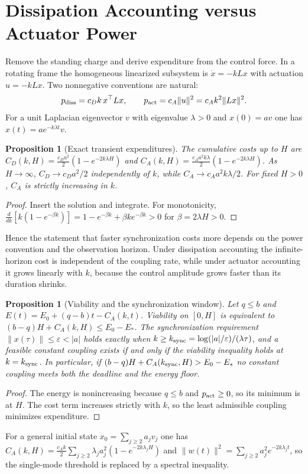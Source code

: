 \documentclass[11pt,notitlepage]{report}
\newtheorem{proposition}[theorem]{Proposition}
\theoremstyle{definition}
\theoremstyle{remark}
\begin{document}
\section{Dissipation Accounting versus Actuator Power}
Remove the standing charge and derive expenditure from the control force. In a rotating frame the homogeneous linearized subsystem is $\dot x=-kLx$ with actuation $u=-kLx$. Two nonnegative conventions are natural:
\[
p_{\rm diss}=c_Dk\,x^\top Lx,\qquad p_{\rm act}=c_A\|u\|^2=c_Ak^2\|Lx\|^2.
\]
For a unit Laplacian eigenvector $v$ with eigenvalue $\lambda>0$ and $x(0)=av$ one has $x(t)=ae^{-k\lambda t}v$.
\begin{proposition}[Exact transient expenditures]\label{prop:transient}
The cumulative costs up to $H$ are
$C_D(k,H)=\tfrac{c_Da^2}2(1-e^{-2k\lambda H})$ and $C_A(k,H)=\tfrac{c_Aa^2k\lambda}2(1-e^{-2k\lambda H})$. As $H\to\infty$, $C_D\to c_Da^2/2$ independently of $k$, while $C_A\to c_Aa^2k\lambda/2$. For fixed $H>0$, $C_A$ is strictly increasing in $k$.
\end{proposition}
\begin{proof}
Insert the solution and integrate. For monotonicity, $\tfrac{d}{dk}[k(1-e^{-\beta k})]=1-e^{-\beta k}+\beta ke^{-\beta k}>0$ for $\beta=2\lambda H>0$.
\end{proof}
Hence the statement that faster synchronization costs more depends on the power convention and the observation horizon. Under dissipation accounting the infinite-horizon cost is independent of the coupling rate, while under actuator accounting it grows linearly with $k$, because the control amplitude grows faster than its duration shrinks.

\begin{proposition}[Viability and the synchronization window]\label{prop:actwindow}
Let $q\le b$ and $E(t)=E_0+(q-b)t-C_A(k,t)$. Viability on $[0,H]$ is equivalent to $(b-q)H+C_A(k,H)\le E_0-E_*$. The synchronization requirement $\|x(\tau)\|\le\varepsilon<|a|$ holds exactly when $k\ge k_{\rm sync}=\log(|a|/\varepsilon)/(\lambda\tau)$, and a feasible constant coupling exists if and only if the viability inequality holds at $k=k_{\rm sync}$. In particular, if $(b-q)H+C_A(k_{\rm sync},H)>E_0-E_*$ no constant coupling meets both the deadline and the energy floor.
\end{proposition}
\begin{proof}
The energy is nonincreasing because $q\le b$ and $p_{\rm act}\ge0$, so its minimum is at $H$. The cost term increases strictly with $k$, so the least admissible coupling minimizes expenditure.
\end{proof}
For a general initial state $x_0=\sum_{j\ge2}a_jv_j$ one has $C_A(k,H)=\tfrac{c_Ak}2\sum_{j\ge2}\lambda_ja_j^2(1-e^{-2k\lambda_jH})$ and $\|w(t)\|^2=\sum_{j\ge2}a_j^2e^{-2k\lambda_jt}$, so the single-mode threshold is replaced by a spectral inequality.
\end{document}
